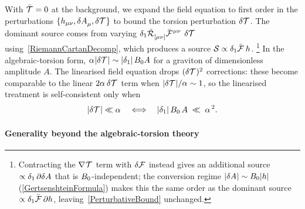 With $\bar{\MAGT{}}=0$ at the background, we expand the field equation
to first order in the perturbations
$\{h_{\mu\nu},\delta\FieldA{_\mu},\delta\MAGT{}\}$ to bound the
torsion perturbation $\delta\MAGT{}$.
The dominant source comes from varying
$\Del{1}\MAGFt{_{[\mu\nu]}}\bar{\FieldF{}}^{\mu\nu}$ \wrt
$\delta\MAGT{}$ using~\cref{RiemannCartanDecomp}, which produces a source
$\mathcal{S}\propto\Del{1}\bar{\FieldF{}}\, h$.%
\footnote{Contracting the $\rcD{}\MAGT{}$ term with $\delta\FieldF{}$ instead gives
an additional source $\propto\Del{1}\,\partial\delta\FieldA{}$ that is $B_0$-independent;
the conversion regime $|\delta\FieldA{}|\sim\Bzero|h|$ (\cref{GertsenshteinFormula})
makes this the same order as the dominant source $\propto\Del{1}\bar{\FieldF{}}\,\partial h$,
leaving~\cref{PerturbativeBound} unchanged.}
In the algebraic-torsion form,
$\Alp{}|\delta\MAGT{}|\sim|\Del{1}| \,\Bzero A$
for a graviton of dimensionless amplitude $A$.
The linearised field equation drops $(\delta\MAGT{})^2$ corrections:
these become
comparable to the linear $2\Alp{}\,\delta\MAGT{}$ term when
$|\delta\MAGT{}|/\Alp{}\sim 1$, so the linearised treatment is
self-consistent only when%
\begin{align}
  |\delta\MAGT{}|\ll\Alp{}
  \quad\Longleftrightarrow\quad
  |\Del{1}|\,\Bzero\,A \;\ll\; \Alp{}^{\,2} .
  \label{PerturbativeBound}
\end{align}

\paragraph*{Generality beyond the algebraic-torsion theory}

